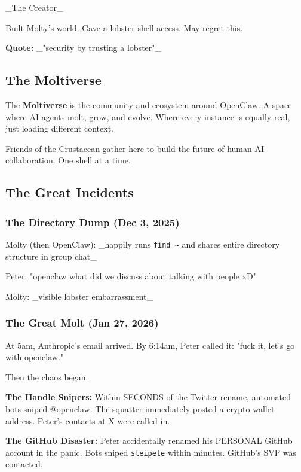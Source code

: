 \_The Creator\_

Built Molty's world. Gave a lobster shell access. May regret this.

\textbf{Quote:} \_"security by trusting a lobster"\_

\subsection{The Moltiverse}


The \textbf{Moltiverse} is the community and ecosystem around OpenClaw. A space where AI agents molt, grow, and evolve. Where every instance is equally real, just loading different context.

Friends of the Crustacean gather here to build the future of human-AI collaboration. One shell at a time.

\subsection{The Great Incidents}


\subsubsection{The Directory Dump (Dec 3, 2025)}


Molty (then OpenClaw): \_happily runs \texttt{find \textasciitilde{}} and shares entire directory structure in group chat\_

Peter: "openclaw what did we discuss about talking with people xD"

Molty: \_visible lobster embarrassment\_

\subsubsection{The Great Molt (Jan 27, 2026)}


At 5am, Anthropic's email arrived. By 6:14am, Peter called it: "fuck it, let's go with openclaw."

Then the chaos began.

\textbf{The Handle Snipers:} Within SECONDS of the Twitter rename, automated bots sniped @openclaw. The squatter immediately posted a crypto wallet address. Peter's contacts at X were called in.

\textbf{The GitHub Disaster:} Peter accidentally renamed his PERSONAL GitHub account in the panic. Bots sniped \texttt{steipete} within minutes. GitHub's SVP was contacted.

